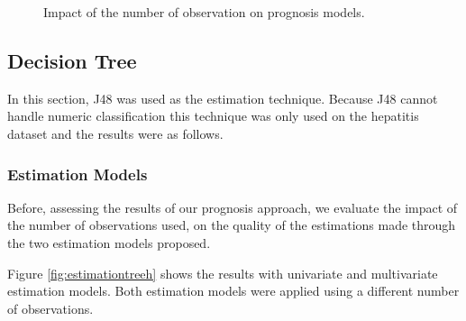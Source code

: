  \begin{figure}[h]
  \begin{subfigmatrix}{2}
  \end{subfigmatrix}
  \caption{Impact of the number of observation on prognosis models.}
  \label{fig:impactregression}
\end{figure}
	
 \subsection{Decision Tree}
\label{subsection:dt}

In this section, J48 was used as the estimation technique. Because J48 cannot handle numeric classification
 this technique was only used on the hepatitis dataset and the results were as follows.

\subsubsection{Estimation Models}
\label{subsubsection:estimation_dt}

Before, assessing the results of our prognosis approach, we evaluate the impact of the number of observations used, on the 
quality of the estimations made through the two estimation models proposed.

Figure \ref{fig:estimationtreeh} shows the results with univariate and multivariate estimation models. Both estimation models were
 applied using a different number of observations. 
 
